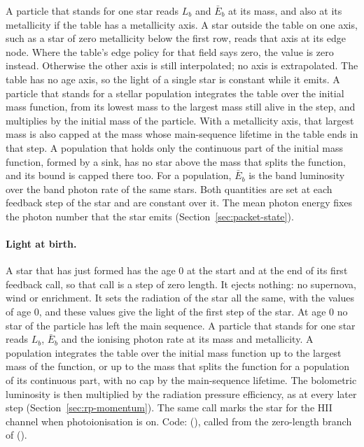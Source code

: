 A particle that stands for one star reads $L_b$ and $\bar E_b$ at its mass, and also at its
metallicity if the table has a metallicity axis. A star outside the table on
one axis, such as a star of zero metallicity below the first row, reads that
axis at its edge node. Where the table's edge policy for that field says
zero, the value is zero instead. Otherwise the other axis is still
interpolated; no axis is extrapolated. The table has no age axis, so
the light of a single star is constant while it emits. A particle that stands
for a stellar population integrates the table over the initial mass function,
from its lowest mass to the largest mass still alive in the step, and
multiplies by the initial mass of the particle. With a metallicity axis, that
largest mass is also capped at the mass whose main-sequence lifetime in the
table ends in that step. A population that holds only the continuous part of
the initial mass function, formed by a sink, has no star above the mass that
splits the function, and its bound is capped there too. For a population,
$\bar E_b$ is the band luminosity over the band photon rate of the same stars.
Both quantities are set at each feedback step of the
star and are constant over it. The mean photon energy fixes the photon number
that the star emits (Section~\ref{sec:packet-state}).

\paragraph{Light at birth.} A star that has just formed has the age $0$ at the
start and at the end of its first feedback call, so that call is a step of zero
length. It ejects nothing: no supernova, wind or enrichment. It sets the
radiation of the star all the same, with the values of age $0$, and these
values give the light of the first step of the star. At age $0$ no star of the
particle has left the main sequence. A particle that stands for one star reads
$L_b$, $\bar E_b$ and the ionising photon rate at its mass and metallicity. A
population integrates the table over the initial mass function up to the
largest mass of the function, or up to the mass that splits the function for a
population of its continuous part, with no cap by the main-sequence lifetime.
The bolometric luminosity is then multiplied by the radiation pressure
efficiency, as at every later step
(Section~\ref{sec:rp-momentum}). The same call marks the star for the HII
channel when photoionisation is on. Code:
(), called from the
zero-length branch of 
().

